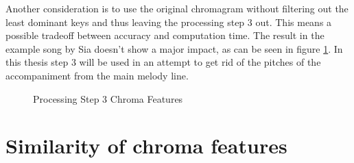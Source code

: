 Another consideration is to use the original chromagram without filtering out the least dominant keys and thus leaving the processing step 3 out. This means a possible tradeoff between accuracy and computation time. The result in the example song by Sia doesn't show a major impact, as can be seen in figure \ref{fig:nomax}. In this thesis step 3 will be used in an attempt to get rid of the pitches of the accompaniment from the main melody line.
\begin{figure}[htbp]
	\centering
	\caption{Processing Step 3 Chroma Features}
	\label{fig:nomax}
\end{figure}

\section{Similarity of chroma features}

